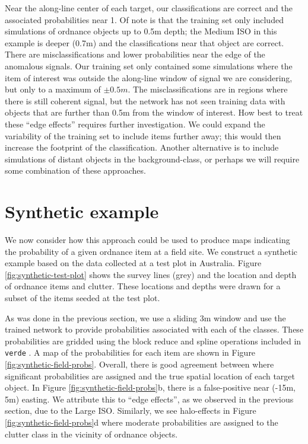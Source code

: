 \documentclass{segabs}
\begin{document}
Near the along-line center of each target, our classifications are correct and the associated probabilities near 1. Of note is that the training set only included simulations of ordnance objects up to 0.5m depth; the Medium ISO in this example is deeper (0.7m) and the classifications near that object are correct. There are misclassifications and lower probabilities near the edge of the anomalous signals. Our training set only contained some simulations where the item of interest was outside the along-line window of signal we are considering, but only to a maximum of $\pm 0.5m$. The misclassifications are in regions where there is still coherent signal, but the network has not seen training data with objects that are further than 0.5m from the window of interest. How best to treat these ``edge effects'' requires further investigation. We could expand the variability of the training set to include items further away; this would then increase the footprint of the classification. Another alternative is to include simulations of distant objects in the background-class, or perhaps we will require some combination of these approaches.





\vspace{-0.45cm}
\section{Synthetic example}
\vspace{-0.25cm}

We now consider how this approach could be used to produce maps indicating the probability of a given ordnance item at a field site. We construct a synthetic example based on the data collected at a test plot in Australia. Figure \ref{fig:synthetic-test-plot} shows the survey lines (grey) and the location and depth of ordnance items and clutter. These locations and depths were drawn for a subset of the items seeded at the test plot.

As was done in the previous section, we use a sliding 3m window and use the trained network to provide probabilities associated with each of the classes. These probabilities are gridded using the block reduce and spline operations included in \texttt{verde}  \citep{Uieda2018}. A map of the probabilities for each item are shown in Figure \ref{fig:synthetic-field-probs}. Overall, there is good agreement between where significant probabilities are assigned and the true spatial location of each target object. In Figure \ref{fig:synthetic-field-probs}b, there is a false-positive near (-15m, 5m) easting. We attribute this to ``edge effects'', as we observed in the previous section, due to the Large ISO. Similarly, we see halo-effects in Figure \ref{fig:synthetic-field-probs}d where moderate probabilities are assigned to the clutter class in the vicinity of ordnance objects.

\end{document}
